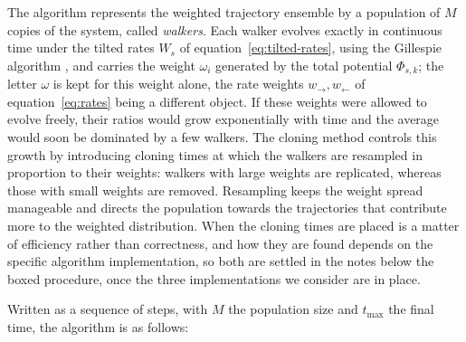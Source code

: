 \documentclass[11pt]{article}
\begin{document}
The algorithm represents the weighted trajectory ensemble by a population of $M$ copies of the system, called \emph{walkers}. Each walker evolves exactly in continuous time under the tilted rates $W_s$ of equation~\ref{eq:tilted-rates}, using the Gillespie algorithm \cite{gillespie1976general,gillespie1977exact}, and carries the weight $\omega_i$ generated by the total potential $\Phi_{s,k}$; the letter $\omega$ is kept for this weight alone, the rate weights $w_\rightarrow, w_\leftarrow$ of equation~\ref{eq:rates} being a different object. If these weights were allowed to evolve freely, their ratios would grow exponentially with time and the average would soon be dominated by a few walkers. The cloning method \cite{giardina2006direct,lecomte2007numerical} controls this growth by introducing cloning times at which the walkers are resampled in proportion to their weights: walkers with large weights are replicated, whereas those with small weights are removed. Resampling keeps the weight spread manageable and directs the population towards the trajectories that contribute more to the weighted distribution. When the cloning times are placed is a matter of efficiency rather than correctness, and how they are found depends on the specific algorithm implementation, so both are settled in the notes below the boxed procedure, once the three implementations we consider are in place.

Written as a sequence of steps, with $M$ the population size and $t_{\max}$ the final time, the algorithm is as follows:
\end{document}

